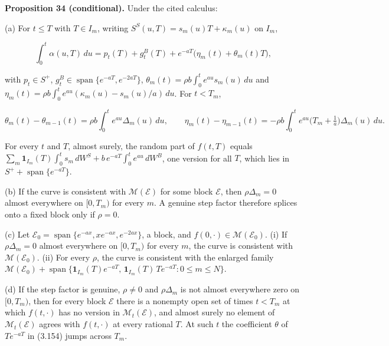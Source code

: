 \documentclass[11pt]{article}
\begin{document}
\label{res:Proposition-34}
\textbf{Proposition 34 (conditional).} Under the cited calculus:

(a) For \(t\le T\) with \(T\in I_m\), writing \(S^S(u,T)=s_m(u)T+\kappa_m(u)\) on \(I_m\),

\begin{equation*}
\int_0^t\alpha(u,T)\,du=p_t(T)+g^B_t(T)+e^{-aT}\bigl(\eta_m(t)+\theta_m(t)T\bigr), \tag{3.154}\label{eq:3.154}
\end{equation*}

with \(p_t\in S^+\), \(g^B_t\in\operatorname{span}\{e^{-aT},e^{-2aT}\}\), \(\theta_m(t)=\rho b\int_0^te^{au}s_m(u)\,du\) and \(\eta_m(t)=\rho b\int_0^te^{au}(\kappa_m(u)-s_m(u)/a)\,du\). For \(t<T_m\),

\begin{equation*}
\theta_m(t)-\theta_{m-1}(t)=\rho b\int_0^te^{au}\Delta_m(u)\,du,\qquad \eta_m(t)-\eta_{m-1}(t)=-\rho b\int_0^te^{au}\bigl(T_m+\tfrac1a\bigr)\Delta_m(u)\,du. \tag{3.155}\label{eq:3.155}
\end{equation*}

For every \(t\) and \(T\), almost surely, the random part of \(f(t,T)\) equals \(\sum_m\mathbf 1_{I_m}(T)\int_0^ts_m\,dW^S+b\,e^{-aT}\int_0^te^{au}\,dW^B\), one version for all \(T\), which lies in \(S^++\operatorname{span}\{e^{-aT}\}\).

(b) If the curve is consistent with \(\mathcal M(\mathcal E)\) for some block \(\mathcal E\), then \(\rho\Delta_m=0\) almost everywhere on \([0,T_m)\) for every \(m\). A genuine step factor therefore splices onto a fixed block only if \(\rho=0\).

(c) Let \(\mathcal E_0=\operatorname{span}\{e^{-ax},xe^{-ax},e^{-2ax}\}\), a block, and \(f(0,\cdot)\in\mathcal M(\mathcal E_0)\). (i) If \(\rho\Delta_m=0\) almost everywhere on \([0,T_m)\) for every \(m\), the curve is consistent with \(\mathcal M(\mathcal E_0)\). (ii) For every \(\rho\), the curve is consistent with the enlarged family \(\mathcal M(\mathcal E_0)+\operatorname{span}\{\mathbf 1_{I_m}(T)e^{-aT},\,\mathbf 1_{I_m}(T)\,Te^{-aT}:0\le m\le N\}\).

(d) If the step factor is genuine, \(\rho\neq0\) and \(\rho\Delta_m\) is not almost everywhere zero on \([0,T_m)\), then for every block \(\mathcal E\) there is a nonempty open set of times \(t<T_m\) at which \(f(t,\cdot)\) has no version in \(\mathcal M_t(\mathcal E)\), and almost surely no element of \(\mathcal M_t(\mathcal E)\) agrees with \(f(t,\cdot)\) at every rational \(T\). At such \(t\) the coefficient \(\theta\) of \(Te^{-aT}\) in (3.154) jumps across \(T_m\).
\end{document}
